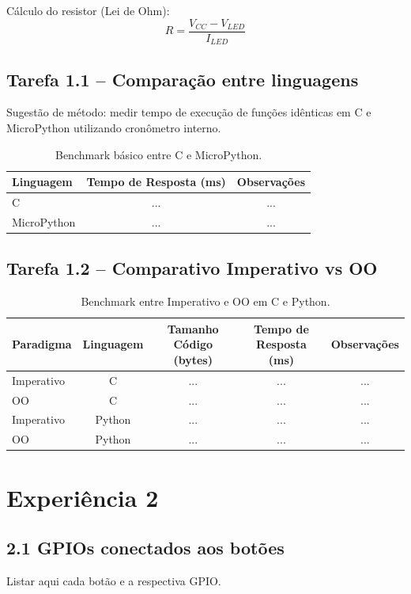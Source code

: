 \documentclass{article}
\begin{document}
Cálculo do resistor (Lei de Ohm):  
\[
R = \frac{V_{CC} - V_{LED}}{I_{LED}}
\]

\subsection{Tarefa 1.1 -- Comparação entre linguagens}
Sugestão de método: medir tempo de execução de funções idênticas em C e MicroPython utilizando cronômetro interno.  

\begin{table}[H]
    \centering
    \begin{tabular}{lcc}
        \toprule
        Linguagem & Tempo de Resposta (ms) & Observações \\
        \midrule
        C          & ... & ... \\
        MicroPython & ... & ... \\
        \bottomrule
    \end{tabular}
    \caption{Benchmark básico entre C e MicroPython.}
\end{table}

\subsection{Tarefa 1.2 -- Comparativo Imperativo vs OO}
\begin{table}[H]
    \centering
    \begin{tabular}{lcccc}
        \toprule
        Paradigma & Linguagem & Tamanho Código (bytes) & Tempo de Resposta (ms) & Observações \\
        \midrule
        Imperativo & C & ... & ... & ... \\
        OO & C & ... & ... & ... \\
        Imperativo & Python & ... & ... & ... \\
        OO & Python & ... & ... & ... \\
        \bottomrule
    \end{tabular}
    \caption{Benchmark entre Imperativo e OO em C e Python.}
\end{table}

\section{Experiência 2}

\subsection{2.1 GPIOs conectados aos botões}
Listar aqui cada botão e a respectiva GPIO.  
\end{document}
